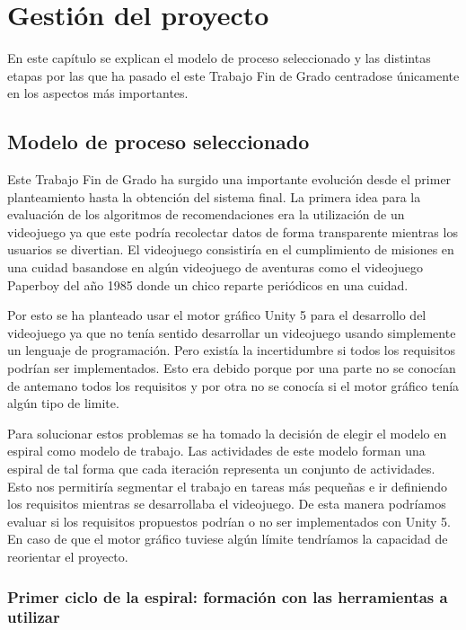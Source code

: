 \chapter{Gestión del proyecto}


En este capítulo se explican el modelo de proceso seleccionado y las distintas etapas por las que ha pasado el este Trabajo Fin de Grado centradose únicamente en los aspectos más importantes.

\section{Modelo de proceso seleccionado}


Este Trabajo Fin de Grado ha surgido una importante evolución desde el primer planteamiento hasta la obtención del sistema final. La primera idea para la evaluación de los algoritmos de recomendaciones era la utilización de un videojuego ya que este podría recolectar datos de forma transparente mientras los usuarios se divertian. El videojuego consistiría en el cumplimiento de misiones en una cuidad basandose en algún videojuego de aventuras como el videojuego Paperboy del año 1985 donde un chico reparte periódicos en una cuidad.

Por esto se ha planteado usar el motor gráfico Unity 5 para el desarrollo del videojuego ya que no tenía sentido desarrollar un videojuego usando simplemente un lenguaje de programación. Pero existía la incertidumbre si todos los requisitos podrían ser implementados. Esto era debido porque por una parte no se conocían de antemano todos los requisitos y por otra no se conocía si el motor gráfico tenía algún tipo de limite. 

Para solucionar estos problemas se ha tomado la decisión de elegir el modelo en espiral como modelo de trabajo. Las actividades de este modelo forman una espiral de tal forma que cada iteración representa un conjunto de actividades. Esto nos permitiría segmentar el trabajo en tareas más pequeñas e ir definiendo los requisitos mientras se desarrollaba el videojuego. De esta manera podríamos evaluar si los requisitos propuestos podrían o no ser implementados con Unity 5. En caso de que el motor gráfico tuviese algún límite tendríamos la capacidad de reorientar el proyecto.

\subsection{Primer ciclo de la espiral: formación con las herramientas a utilizar}

